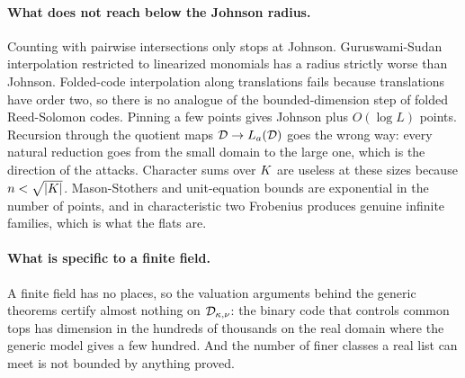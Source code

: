 \paragraph{What does not reach below the Johnson radius.} Counting with pairwise intersections only stops at Johnson. Guruswami-Sudan interpolation restricted to linearized monomials has a radius strictly worse than Johnson. Folded-code interpolation along translations fails because translations have order two, so there is no analogue of the bounded-dimension step of folded Reed-Solomon codes. Pinning a few points gives Johnson plus $O(\log L)$ points. Recursion through the quotient maps $\mathcal{D}\to L_a(\mathcal{D})$ goes the wrong way: every natural reduction goes from the small domain to the large one, which is the direction of the attacks. Character sums over $K$ are useless at these sizes because $n<\sqrt{|K|}$. Mason-Stothers and unit-equation bounds are exponential in the number of points, and in characteristic two Frobenius produces genuine infinite families, which is what the flats are.

\paragraph{What is specific to a finite field.} A finite field has no places, so the valuation arguments behind the generic theorems certify almost nothing on $\mathcal{D}_{\kappa,\nu}$: the binary code that controls common tops has dimension in the hundreds of thousands on the real domain where the generic model gives a few hundred. And the number of finer classes a real list can meet is not bounded by anything proved.

